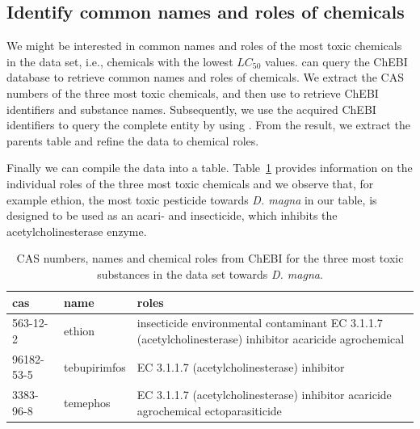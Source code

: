 \documentclass[article]{jss}
\begin{document}
\subsection[Identify common names and roles of chemicals]{Identify common names and roles of chemicals}
We might be interested in common names and roles of the most toxic chemicals in the  data set, i.e., chemicals with the lowest $LC_{50}$ values.  can query the ChEBI database \citep{chebi} to retrieve common names and roles of chemicals. We extract the CAS numbers of the three most toxic chemicals, and then use  to retrieve ChEBI identifiers and substance names. Subsequently, we use the acquired ChEBI identifiers to query the complete entity by using . From the result, we extract the parents table and refine the data to chemical roles.

\begin{CodeChunk}
\end{CodeChunk}

Finally we can compile the data into a table. Table~\ref{tab:chebi} provides information on the individual roles of the three most toxic chemicals and we observe that, for example ethion, the most toxic pesticide towards \textit{D. magna} in our table, is designed to be used as an acari- and insecticide, which inhibits the acetylcholinesterase enzyme.

\begin{table}[t!]
\centering
\begin{tabular}{p{2cm}p{2cm}p{8cm}}
  \hline
  cas & name & roles \\
  \hline
  563-12-2 & ethion & insecticide \newline environmental contaminant \newline EC 3.1.1.7 (acetylcholinesterase) inhibitor \newline acaricide \newline agrochemical \\
  96182-53-5 & tebupirimfos & EC 3.1.1.7 (acetylcholinesterase) inhibitor \\
  3383-96-8 & temephos & EC 3.1.1.7 (acetylcholinesterase) inhibitor \newline acaricide \newline agrochemical \newline ectoparasiticide \\
\hline
\end{tabular}
\caption{CAS numbers, names and chemical roles from ChEBI for the three most toxic substances in the  data set towards \textit{D. magna}.}
\label{tab:chebi}
\end{table}
\end{document}
